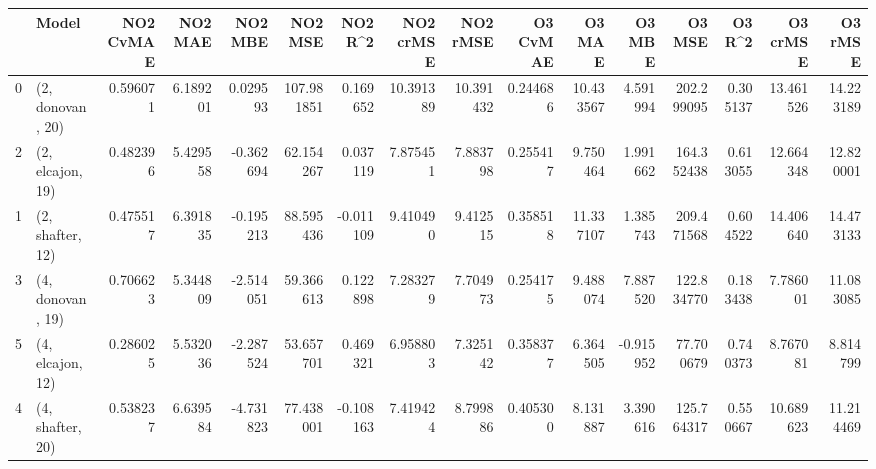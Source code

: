 \begin{tabular}{llrrrrrrrrrrrrrr}
\toprule
{} &             Model &  NO2 CvMAE &   NO2 MAE &   NO2 MBE &     NO2 MSE &   NO2 R\textasciicircum2 &  NO2 crMSE &   NO2 rMSE &  O3 CvMAE &     O3 MAE &    O3 MBE &      O3 MSE &    O3 R\textasciicircum2 &   O3 crMSE &    O3 rMSE \\
\midrule
0 &  (2, donovan, 20) &   0.596071 &  6.189201 &  0.029593 &  107.981851 &  0.169652 &  10.391389 &  10.391432 &  0.244686 &  10.433567 &  4.591994 &  202.299095 &  0.305137 &  13.461526 &  14.223189 \\
2 &  (2, elcajon, 19) &   0.482396 &  5.429558 & -0.362694 &   62.154267 &  0.037119 &   7.875451 &   7.883798 &  0.255417 &   9.750464 &  1.991662 &  164.352438 &  0.613055 &  12.664348 &  12.820001 \\
1 &  (2, shafter, 12) &   0.475517 &  6.391835 & -0.195213 &   88.595436 & -0.011109 &   9.410490 &   9.412515 &  0.358518 &  11.337107 &  1.385743 &  209.471568 &  0.604522 &  14.406640 &  14.473133 \\
3 &  (4, donovan, 19) &   0.706623 &  5.344809 & -2.514051 &   59.366613 &  0.122898 &   7.283279 &   7.704973 &  0.254175 &   9.488074 &  7.887520 &  122.834770 &  0.183438 &   7.786001 &  11.083085 \\
5 &  (4, elcajon, 12) &   0.286025 &  5.532036 & -2.287524 &   53.657701 &  0.469321 &   6.958803 &   7.325142 &  0.358377 &   6.364505 & -0.915952 &   77.700679 &  0.740373 &   8.767081 &   8.814799 \\
4 &  (4, shafter, 20) &   0.538237 &  6.639584 & -4.731823 &   77.438001 & -0.108163 &   7.419424 &   8.799886 &  0.405300 &   8.131887 &  3.390616 &  125.764317 &  0.550667 &  10.689623 &  11.214469 \\
\bottomrule
\end{tabular}
